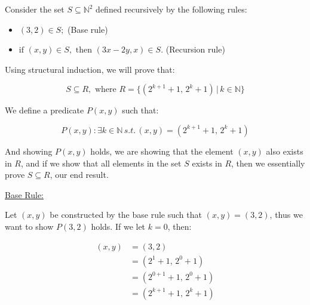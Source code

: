 \documentclass[20pt]{article}
\begin{document}
\begin{text}
    Consider the set $S \subseteq \mathbb{N}^2$ defined recursively by the following rules:
\end{text}

\begin{itemize}
    \item $(3,2) \in S;$ (Base rule)
    \item $\text{if } (x,y) \in S, \text{ then } (3x-2y, x) \in S.$ (Recursion rule)
\end{itemize}

\noindent 
\begin{text}
    Using structural induction, we will prove that:
\end{text}

\begin{equation}
    S \subseteq R, \text{ where } R = \{(2^{k + 1} + 1, \, 2^{k} + 1) \, | \, k \in \mathbb{N}\} \nonumber
\end{equation}

\noindent 
\begin{text}
    We define a predicate $P(x,y)$ such that:
\end{text}

\begin{equation}
    P(x,y): \exists k \in \mathbb{N} \nonumber \, s.t. \, (x,y) = (2^{k + 1} + 1, \, 2^{k} + 1)
\end{equation}

\noindent 
\begin{text}
    And showing $P(x,y)$ holds, we are showing that the element $(x,y)$ also exists in $R$, and if we show that all elements in the set $S$ exists in $R$, then we essentially prove $S \subseteq R$, our end result.\\
\end{text}

\noindent
\underline{Base Rule:}

\noindent 
\begin{text}
    Let $(x,y)$ be constructed by the base rule such that $(x,y) = (3,2)$, thus we want to show $P(3,2)$ holds.
    If we let $k = 0$, then:
\end{text}

\begin{align}
    (x,y) &= (3,2)\nonumber\\
    &= (2^1 + 1, \, 2^0 + 1) \nonumber\\
    &= (2^{0 + 1} + 1, \, 2^{0} + 1)\nonumber\\
    &= (2^{k + 1} + 1, \, 2^{k} + 1)\tag{Since we picked $k = 0$}\nonumber
\end{align}
\end{document}
